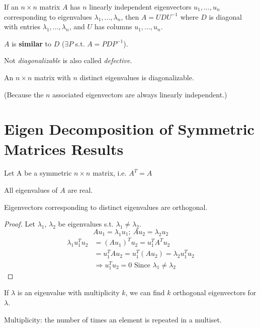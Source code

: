 \documentclass[11pt]{elegantbook}
\begin{document}
\begin{theorem}
    If an $n\times n$ matrix $A$ has $n$ linearly independent eigenvectors $u_1,...,u_n$ corresponding to eigenvalues $\lambda_1,...,\lambda_n$, then $A = UDU^{-1}$ where $D$ is diagonal with entries $\lambda_1,...,\lambda_n$, and $U$ has columns $u_1,...,u_n$.
\end{theorem}
$A$ is \textbf{similar} to $D$ ($\exists P$ s.t. $A=PDP^{-1}$).

Not \textit{diagonalizable} is also called \textit{defective}.

\begin{theorem}
    An $n\times n$ matrix with $n$ distinct eigenvalues is diagonalizable.
\end{theorem}
(Because the $n$ associated eigenvectors are always linearly independent.)


\section{Eigen Decomposition of Symmetric Matrices Results}
Let A be a symmetric $n\times n$ matrix, i.e. $A^T=A$
\begin{proposition}
All eigenvalues of $A$ are real.
\end{proposition}
\begin{proposition}
Eigenvectors corresponding to distinct eigenvalues are orthogonal.
\end{proposition}
\begin{proof}
\quad

Let $\lambda_1$, $\lambda_2$ be eigenvalues s.t. $\lambda_1\neq\lambda_2$.
$$Au_1=\lambda_1 u_1;\ Au_2=\lambda_2 u_2$$
\begin{equation}
    \begin{aligned}
        \lambda_1 u_1^Tu_2&=(Au_1)^Tu_2=u^T_1A^Tu_2\\
        &=u^T_1Au_2=u^T_1(Au_2)=\lambda_2 u^T_1u_2\\
        &\Rightarrow	u_1^Tu_2=0\text{ Since }\lambda_1\neq\lambda_2
    \end{aligned}
    \nonumber
\end{equation}
\end{proof}

\begin{proposition}
If $\lambda$ is an eigenvalue with multiplicity $k$, we can find $k$ orthogonal eigenvectors for $\lambda$.
\end{proposition}
Multiplicity: the number of times an element is repeated in a multiset.
\end{document}
